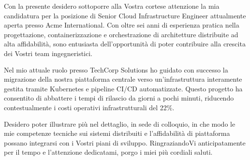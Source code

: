 \documentclass[
    italian,            %
    color-default,      %
]{tidylatexcv}
\begin{document}

\begin{tlcvinfo}
\end{tlcvinfo}


\begin{tlcvcoverletter}
    Con la presente desidero sottoporre alla Vostra cortese attenzione la mia candidatura per la posizione di Senior Cloud Infrastructure Engineer attualmente aperta presso Acme International. Con oltre sei anni di esperienza pratica nella progettazione, containerizzazione e orchestrazione di architetture distribuite ad alta affidabilità, sono entusiasta dell'opportunità di poter contribuire alla crescita dei Vostri team ingegneristici.

    Nel mio attuale ruolo presso TechCorp Solutions ho guidato con successo la migrazione della nostra piattaforma centrale verso un'infrastruttura interamente gestita tramite Kubernetes e pipeline CI/CD automatizzate. Questo progetto ha consentito di abbattere i tempi di rilascio da giorni a pochi minuti, riducendo contestualmente i costi operativi infrastrutturali del 22\%.

    Desidero poter illustrare più nel dettaglio, in sede di colloquio, in che modo le mie competenze tecniche sui sistemi distribuiti e l'affidabilità di piattaforma possano integrarsi con i Vostri piani di sviluppo. RingraziandoVi anticipatamente per il tempo e l'attenzione dedicatami, porgo i miei più cordiali saluti.
\end{tlcvcoverletter}

\tlcvsignature[Roma]
\end{document}
